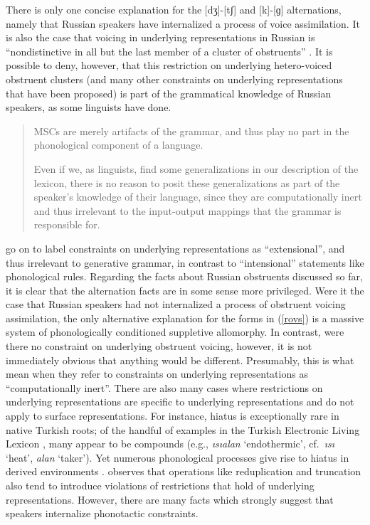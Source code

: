 There is only one concise explanation for the [dʒ]-[tʃ] and [k]-[ɡ] alternations, namely that Russian speakers have internalized a process of voice assimilation.
It is also the case that voicing in underlying representations in Russian is ``nondistinctive in all but the last member of a cluster of obstruents'' \citep[283]{A74}.
It is possible to deny, however, that this restriction on underlying hetero-voiced obstruent clusters (and many other constraints on underlying representations that have been proposed) is part of the grammatical knowledge of Russian speakers, as some linguists have done.

\begin{quote}
MSCs are merely artifacts of the grammar, and thus play no part in the phonological component of a language. \citep[302]{Clayton1976}

Even if we, as linguists, find some generalizations in our description of the lexicon, there is no reason to posit these generalizations as part of the speaker's knowledge of their language, since they are computationally inert and thus irrelevant to the input-output mappings that the grammar is responsible for. \citep[17f.]{PE}
\end{quote}

\noindent
\citeauthor{PE} go on to label constraints on underlying representations as ``extensional'', and thus irrelevant to generative grammar, in contrast to ``intensional'' statements like phonological rules.
Regarding the facts about Russian obstruents discussed so far, it is clear  that the alternation facts are in some sense more privileged.
Were it the case that Russian speakers had not internalized a process of obstruent voicing assimilation, the only alternative explanation for the forms in (\ref{rovs}) is a massive system of phonologically conditioned suppletive allomorphy.
In contrast, were there no constraint on underlying obstruent voicing, however, it is not immediately obvious that anything would be different.
Presumably, this is what \citeauthor{PE} mean when they refer to constraints on underlying representations as ``computationally inert''.
There are also many cases where restrictions on underlying representations are specific to underlying representations and do not apply to surface representations.
For instance, hiatus is exceptionally rare in native Turkish roots; of the handful of examples in the Turkish Electronic Living Lexicon \citep{TELL}, many appear to be compounds (e.g., \emph{ısıalan} `endothermic', cf.~\emph{ısı} `heat', \emph{alan} `taker').
Yet numerous phonological processes give rise to hiatus in derived environments \citep[e.g.,][]{Kabak2007b}.
\citet{Silverman2000} observes that operations like reduplication and truncation also tend to introduce violations of restrictions that hold of underlying representations.
However, there are many facts which strongly suggest that speakers internalize phonotactic constraints.

